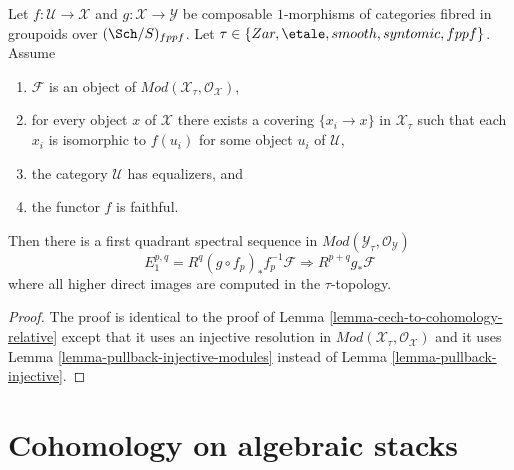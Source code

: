 \begin{lemma}
\label{lemma-cech-to-cohomology-relative-modules}
Let $f : \mathcal{U} \to \mathcal{X}$ and
$g : \mathcal{X} \to \mathcal{Y}$
be composable $1$-morphisms of categories fibred
in groupoids over $(\Sch/S)_{fppf}$. Let
$\tau \in \{Zar, \etale, smooth, syntomic, \linebreak[0] fppf\}$.
Assume
\begin{enumerate}
\item $\mathcal{F}$ is an object of
$\textit{Mod}(\mathcal{X}_\tau, \mathcal{O}_\mathcal{X})$,
\item for every object $x$ of $\mathcal{X}$ there exists a covering
$\{x_i \to x\}$ in $\mathcal{X}_\tau$ such that each $x_i$ is isomorphic
to $f(u_i)$ for some object $u_i$ of $\mathcal{U}$,
\item the category $\mathcal{U}$ has equalizers, and
\item the functor $f$ is faithful.
\end{enumerate}
Then there is a first quadrant spectral sequence in
$\textit{Mod}(\mathcal{Y}_\tau, \mathcal{O}_\mathcal{Y})$
$$
E_1^{p, q} = R^q(g \circ f_p)_*f_p^{-1}\mathcal{F}
\Rightarrow
R^{p + q}g_*\mathcal{F}
$$
where all higher direct images are computed in the $\tau$-topology.
\end{lemma}

\begin{proof}
The proof is identical to the proof of
Lemma \ref{lemma-cech-to-cohomology-relative}
except that it uses an injective resolution in
$\textit{Mod}(\mathcal{X}_\tau, \mathcal{O}_\mathcal{X})$
and it uses
Lemma \ref{lemma-pullback-injective-modules}
instead of
Lemma \ref{lemma-pullback-injective}.
\end{proof}






\section{Cohomology on algebraic stacks}
\label{section-cohomology}

